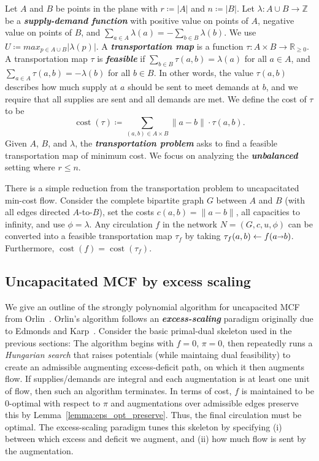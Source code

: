 \documentclass[a4paper,UKenglish]{socg-lipics-v2018}
\def\reals{\mathbb{R}}
\def\ints{\mathbb{Z}}
\def\abs#1{\mathopen| #1 \mathclose|}		%
\def\norm#1{\mathopen\| #1 \mathclose\|}	%
\def\tsupply{\lambda}
\def\fsupply{\phi}
\def\arcto{\mathord\shortrightarrow}
\def\arc#1#2{#1\arcto#2}
\def\cost{\operatorname{cost}}
\theoremstyle{plain}
\numberwithin{figure}{section}
\def\EMPH#1{\textbf{\emph{\boldmath #1}}}
\begin{document}
Let $A$ and $B$ be points in the plane with $r \coloneqq \abs{A}$ and
$n \coloneqq \abs{B}$.
Let $\tsupply:A \cup B \to \ints$ be a \EMPH{supply-demand function} with
positive value on points of $A$, negative value on points of $B$, and
$\sum_{a \in A} \tsupply(a) = - \sum_{b \in B} \tsupply(b)$.
We use $U \coloneqq max_{p \in A \cup B} \abs{\tsupply(p)}$.
A \EMPH{transportation map} is a function
$\tau: A \times B \to \reals_{\geq 0}$.
A transportation map $\tau$ is \EMPH{feasible} if
$\sum_{b \in B} \tau(a, b) = \tsupply(a)$ for all $a \in A$, and
$\sum_{a \in A} \tau(a, b) = -\tsupply(b)$ for all $b \in B$.
In other words, the value $\tau(a, b)$ describes how much supply at $a$ should
be sent to meet demands at $b$, and we require that all supplies are sent
and all demands are met.
We define the cost of $\tau$ to be
\[
	\cost(\tau) \coloneqq \sum_{(a, b) \in A \times B} \norm{a-b} \cdot \tau(a, b).
\]
Given $A$, $B$, and $\tsupply$, the \EMPH{transportation problem} asks to find
a feasible transportation map of minimum cost.
We focus on analyzing the \EMPH{unbalanced} setting where $r \leq n$.

There is a simple reduction from the transportation problem to uncapacitated
min-cost flow.
Consider the complete bipartite graph $G$ between $A$ and $B$ (with all edges
directed $A$-to-$B$), set the costs $c(a, b) = \norm{a-b}$, all capacities to
infinity, and use $\fsupply = \tsupply$.
Any circulation $f$ in the network $N = (G, c, u, \fsupply)$ can be converted
into a feasible transportation map $\tau_f$ by taking
$\tau_f(a, b) \gets f(\arc ab)$.
Furthermore, $\cost(f) = \cost(\tau_f)$.

\subsection{Uncapacitated MCF by excess scaling}

We give an outline of the strongly polynomial algorithm for uncapacited MCF
from Orlin~\cite{O93}.
Orlin's algorithm follows an \EMPH{excess-scaling} paradigm originally due to
Edmonds and Karp~\cite{EK72}.
Consider the basic primal-dual skeleton used in the previous sections:
The algorithm begins with $f = 0$, $\pi = 0$, then repeatedly runs a
\emph{Hungarian search} that raises potentials (while maintaing dual
feasibility) to create an admissible augmenting excess-deficit path, on which
it then augments flow.
If supplies/demands are integral and each augmentation is at least one unit of
flow, then such an algorithm terminates.
In terms of cost, $f$ is maintained to be $0$-optimal with respect to $\pi$
and augmentations over admissible edges preserve this by
Lemma~\ref{lemma:eps_opt_preserve}.
Thus, the final circulation must be optimal.
The excess-scaling paradigm tunes this skeleton by specifying (i) between which
excess and deficit we augment, and (ii) how much flow is sent by the
augmentation.
\end{document}

